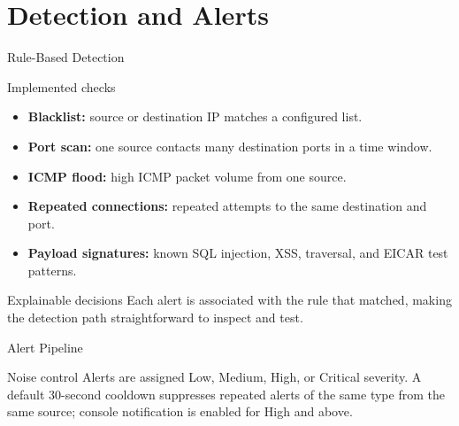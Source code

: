 \documentclass{SKP-beamer}
\begin{document}
\section{Detection and Alerts}
\begin{frame}{Rule-Based Detection}
\begin{block}{Implemented checks}
\begin{itemize}
  \item \textbf{Blacklist:} source or destination IP matches a configured list.
  \item \textbf{Port scan:} one source contacts many destination ports in a time window.
  \item \textbf{ICMP flood:} high ICMP packet volume from one source.
  \item \textbf{Repeated connections:} repeated attempts to the same destination and port.
  \item \textbf{Payload signatures:} known SQL injection, XSS, traversal, and EICAR test patterns.
\end{itemize}
\end{block}
\begin{exampleblock}{Explainable decisions}
Each alert is associated with the rule that matched, making the detection path straightforward to inspect and test.
\end{exampleblock}
\end{frame}

\begin{frame}{Alert Pipeline}
\centering
{}
\vspace{0.5cm}
\begin{block}{Noise control}
Alerts are assigned Low, Medium, High, or Critical severity. A default 30-second cooldown suppresses repeated alerts of the same type from the same source; console notification is enabled for High and above.
\end{block}
\end{frame}
\end{document}
